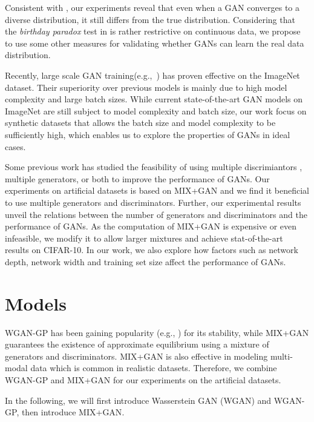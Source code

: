 \documentclass[conference]{IEEEtran}
\newcommand{\eg}{{e.g.,~}}
\begin{document}
Consistent with \cite{dogans}, our experiments reveal that even when a GAN converges to a diverse distribution, it still differs from the true distribution. Considering that the \textit{birthday paradox} test in \cite{dogans} is rather restrictive on continuous data, we propose to use some other measures for validating whether GANs can learn the real data distribution.

Recently, large scale GAN training(\eg \cite{biggan,bigbigan,logan,cr-biggan}) has proven effective on the ImageNet \cite{imagenet} dataset. Their superiority over previous models is mainly due to high model complexity and large batch sizes.
While current state-of-the-art GAN models on ImageNet are still subject to model complexity and batch size, our work focus on synthetic datasets that allows the batch size and model complexity to be sufficiently high, which enables us to explore the properties of GANs in ideal cases.

Some previous work has studied the feasibility of using multiple discrimiantors \cite{GMAN}, multiple generators\cite{MADGAN, MGAN}, or both \cite{generalization} to improve the performance of GANs. Our experiments on artificial datasets is based on MIX+GAN \cite{generalization} and we find it beneficial to use multiple generators and discriminators.
Further, our experimental results unveil the relations between the number of generators and discriminators and the performance of GANs. As the computation of MIX+GAN is expensive or even infeasible, we modify it to allow larger mixtures and achieve stat-of-the-art results on CIFAR-10.
In our work, we also explore how factors such as network depth, network width and training set size affect the performance of GANs.
%
 \section{Models}





WGAN-GP\cite{improvedwgan} has been gaining popularity (e.g., \cite{PGGAN,stargan,styleGAN}) for its stability, while MIX+GAN\cite{generalization} guarantees the existence of approximate equilibrium using a mixture of generators and discriminators. MIX+GAN is also effective in modeling multi-modal data which is common in realistic datasets. Therefore, we combine WGAN-GP and MIX+GAN for our experiments on the artificial datasets. 

In the following, we will first introduce Wasserstein GAN (WGAN)\cite{wgan} and WGAN-GP\cite{improvedwgan}, then introduce MIX+GAN\cite{generalization}.
\end{document}
